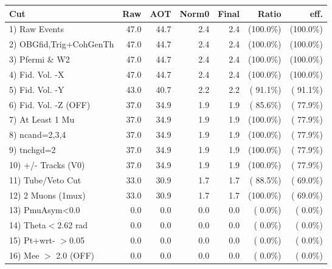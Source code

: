  \begin{table}[h!]\centering
 \begin{tabular}{||l||r|r|r|r|r|r||}
 \hline
 \hline
 Cut & Raw & AOT & Norm0 & Final & Ratio & eff.       \\
 \hline
  1) Raw Events           &         47.0 &         44.7 &          2.4 &          2.4 & (100.0\%) & (100.0\%) \\
  2) OBGfid,Trig+CohGenTh &         47.0 &         44.7 &          2.4 &          2.4 & (100.0\%) & (100.0\%) \\
  3) Pfermi \& W2         &         47.0 &         44.7 &          2.4 &          2.4 & (100.0\%) & (100.0\%) \\
  4) Fid. Vol. -X         &         47.0 &         44.7 &          2.4 &          2.4 & (100.0\%) & (100.0\%) \\
  5) Fid. Vol. -Y         &         43.0 &         40.7 &          2.2 &          2.2 & ( 91.1\%) & ( 91.1\%) \\
  6) Fid. Vol. -Z (OFF)   &         37.0 &         34.9 &          1.9 &          1.9 & ( 85.6\%) & ( 77.9\%) \\
  7) At Least 1 Mu        &         37.0 &         34.9 &          1.9 &          1.9 & (100.0\%) & ( 77.9\%) \\
  8) ncand=2,3,4          &         37.0 &         34.9 &          1.9 &          1.9 & (100.0\%) & ( 77.9\%) \\
  9) tnchgd=2             &         37.0 &         34.9 &          1.9 &          1.9 & (100.0\%) & ( 77.9\%) \\
 10) +/- Tracks (V0)      &         37.0 &         34.9 &          1.9 &          1.9 & (100.0\%) & ( 77.9\%) \\
 11) Tube/Veto Cut        &         33.0 &         30.9 &          1.7 &          1.7 & ( 88.5\%) & ( 69.0\%) \\
 12) 2 Muons (1mux)       &         33.0 &         30.9 &          1.7 &          1.7 & (100.0\%) & ( 69.0\%) \\
 13) PmuAsym<0.0          &          0.0 &          0.0 &          0.0 &          0.0 & (  0.0\%) & (  0.0\%) \\
 14) Theta$<$2.62 rad     &          0.0 &          0.0 &          0.0 &          0.0 & (  0.0\%) & (  0.0\%) \\
 15) Pt+wrt- $>$0.05      &          0.0 &          0.0 &          0.0 &          0.0 & (  0.0\%) & (  0.0\%) \\
 16) Mee $>$ 2.0  (OFF)   &          0.0 &          0.0 &          0.0 &          0.0 & (  0.0\%) & (  0.0\%) \\

\end{tabular}
\end{table}

